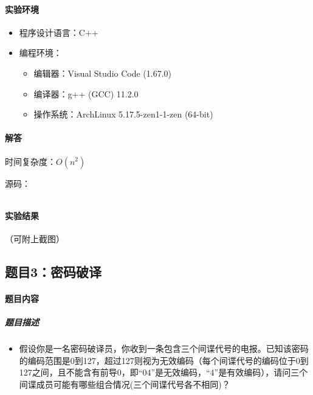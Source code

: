 \documentclass[12pt,a4paper]{ctexart}
\begin{document}
\vspace{5pt}

\paragraph{实验环境}
\begin{itemize}
    \item 程序设计语言：C++
    \item 编程环境：
    \begin{itemize}
        \item 编辑器：Visual Studio Code (1.67.0)
        \item 编译器：g++ (GCC) 11.2.0
        \item 操作系统：ArchLinux 5.17.5-zen1-1-zen (64-bit)
    \end{itemize}
\end{itemize}

\vspace{5pt}

\paragraph{解答} 时间复杂度：$O(n^2)$

源码：
\inputminted[bgcolor=codebg,frame=lines,autogobble,linenos=true,breaklines]{cpp}{src/b.cpp}

\vspace{5pt}

\paragraph{实验结果}
（可附上截图）

\newpage

\subsection*{题目3：密码破译}
\paragraph{题目内容}
\subparagraph{题目描述}

\begin{itemize}
    \item 假设你是一名密码破译员，你收到一条包含三个间谍代号的电报。已知该密码的编码范围是0到127，超过127则视为无效编码（每个间谍代号的编码位于0到127之间，且不能含有前导0，即“04”是无效编码，“4”是有效编码），请问三个间谍成员可能有哪些组合情况(三个间谍代号各不相同)？

\end{itemize}
\end{document}
